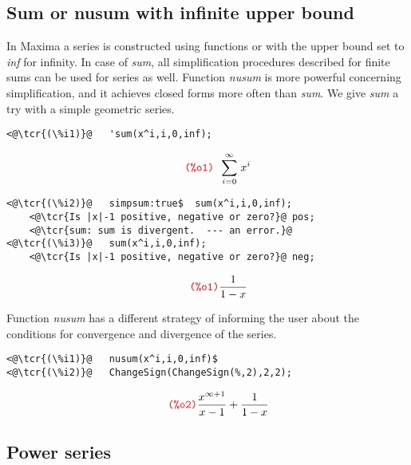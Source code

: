 \documentclass[../Maxima_Workbook.tex]{subfiles}
\begin{document}
\subsection{Sum or nusum with infinite upper bound}\label{SP1}

In Maxima a series is constructed using functions  or  with the upper bound set to \emph{inf} for infinity. In case of \emph{sum}, all simplification procedures described for finite sums can be used for series as well. Function \emph{nusum} is more powerful concerning simplification, and it achieves closed forms more often than \emph{sum}. We give \emph{sum} a try with a simple geometric series.

\lz \begin{small}
\color{blue} \leqn
\begin{lstlisting}
<@\tcr{(\%i1)}@   'sum(x^i,i,0,inf);
\end{lstlisting}
\vspace{-5mm} \[\tag*{\tcr{\ttfamily (\%o1)}} \en \sum_{i=0}^{\infty }{\left. {{x}^{i}}\right.} \]
\vspace{-5mm} \begin{lstlisting}
<@\tcr{(\%i2)}@   simpsum:true$  sum(x^i,i,0,inf);
	<@\tcr{Is |x|-1 positive, negative or zero?}@ pos;
	<@\tcr{sum: sum is divergent.  --- an error.}@	
<@\tcr{(\%i3)}@   sum(x^i,i,0,inf);
	<@\tcr{Is |x|-1 positive, negative or zero?}@ neg;
\end{lstlisting}
\vspace{-4mm} \[\tag*{\tcr{\ttfamily (\%o1)}} \frac{1}{1-x} \]
\color{black} \reqn
\end{small} \vspace{-4mm}

Function \emph{nusum} has a different strategy of informing the user about the conditions for convergence and divergence of the series.

\lz \begin{small}
\color{blue} \leqn
\begin{lstlisting}
<@\tcr{(\%i1)}@   nusum(x^i,i,0,inf)$
<@\tcr{(\%i2)}@   ChangeSign(ChangeSign(%,2),2,2);
\end{lstlisting}
\vspace{-5mm} \[\tag*{\tcr{\ttfamily (\%o2)}} \frac{{{x}^{\infty +1}}}{x-1}+\frac{1}{1-x} \]
\color{black} \reqn
\end{small} \vspace{-4mm}

\subsection{Power series}
\end{document}
